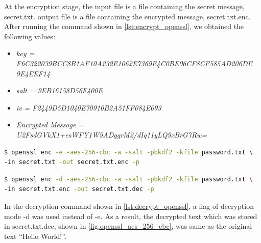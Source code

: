 At the encryption stage, the {\selectfont input file} is a
file containing the secret message, {\selectfont secret.txt}.
{\selectfont output file} is a file containing the encrypted
message, {\selectfont secret.txt.enc}. After running the command
shown in \autoref{lst:encrypt_openssl}, we obtained the following values:

\begin{itemize}
    \item \emph{key = F6C322039BCC8B1AF10A232E1062E7369E4C0BE06CF8CF585AD206DE
    9E4EEF14}
    \item \emph{salt = 9EB16158D56F400E}
    \item \emph{iv = F2449D5D1040E70910B2A51FF084E093}
    \item \emph{Encrypted Message = U2FsdGVkX1+esWFY1W9ADggrM2/dIq11yLQ9xBrG7Rw=}
\end{itemize}

\begin{lstlisting}[language=Bash, caption=Encrypting a file using OpenSSL
    , label={lst:encrypt_openssl}]
$ openssl enc -e -aes-256-cbc -a -salt -pbkdf2 -kfile password.txt \
-in secret.txt -out secret.txt.enc -p
\end{lstlisting}

\begin{lstlisting}[language=Bash, caption=Decrypting a file using OpenSSL
    , label={lst:decrypt_openssl}]
$ openssl enc -d -aes-256-cbc -a -salt -pbkdf2 -kfile password.txt \
-in secret.txt.enc -out secret.txt.dec -p
\end{lstlisting}

In the decryption command shown in \autoref{lst:decrypt_openssl}, a flag
of decryption mode {\selectfont -d} was used instead of
{\fontfamily{qcr}\selectfont -e}. As a result, the decrypted text which was
stored in {\fontfamily{qcr}\selectfont secret.txt.dec}, shown in
\autoref{fig:openssl_aes_256_cbc}, was same as the original text ``Hello World!''.

